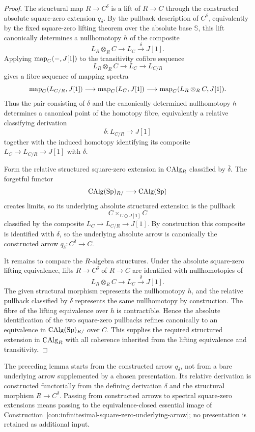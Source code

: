 \begin{proof}
The structural map $R\to C^\delta$ is a lift of $R\to C$ through the
constructed absolute square-zero extension \(q_\delta\).  By the pullback
description of \(C^\delta\), equivalently by the fixed square-zero lifting
theorem over the absolute base \(\mathbb S\), this lift canonically determines
a nullhomotopy \(h\) of the composite
\[
    L_R\otimes_RC
    \longrightarrow
    L_C
    \xrightarrow{\delta}
    J[1].
\]
Applying $\operatorname{map}_C(-,J[1])$ to the transitivity cofibre sequence
\[
    L_R\otimes_RC\longrightarrow L_C\longrightarrow L_{C/R}
\]
gives a fibre sequence of mapping spectra
\[
    \operatorname{map}_C(L_{C/R},J[1])
    \longrightarrow
    \operatorname{map}_C(L_C,J[1])
    \longrightarrow
    \operatorname{map}_C(L_R\otimes_RC,J[1]).
\]
Thus the pair consisting of $\delta$ and the canonically determined
nullhomotopy $h$ determines a canonical point of the homotopy fibre,
equivalently a relative classifying derivation
\[
    \overline\delta:L_{C/R}\longrightarrow J[1]
\]
together with the induced homotopy identifying its composite
$L_C\to L_{C/R}\to J[1]$ with $\delta$.

Form the relative structured square-zero extension in $\operatorname{CAlg}_R$ classified by
$\overline\delta$.  The forgetful functor
\[
    \operatorname{CAlg}(\mathrm{Sp})_{R/}\longrightarrow\operatorname{CAlg}(\mathrm{Sp})
\]
creates limits, so its underlying absolute structured extension is the
pullback
\[
    C\times_{C\oplus J[1]}C
\]
classified by the composite $L_C\to L_{C/R}\to J[1]$.  By construction this
composite is identified with $\delta$, so the underlying absolute arrow is
canonically the constructed arrow \(q_\delta:C^\delta\to C\).

It remains to compare the $R$-algebra structures.  Under the absolute
square-zero lifting equivalence, lifts $R\to C^\delta$ of $R\to C$ are
identified with nullhomotopies of
\[
    L_R\otimes_RC\longrightarrow L_C\xrightarrow{\delta}J[1].
\]
The given structural morphism represents the nullhomotopy $h$, and the
relative pullback classified by $\overline\delta$ represents the same
nullhomotopy by construction.  The fibre of the lifting equivalence over
$h$ is contractible.  Hence the absolute identification of the two
square-zero pullbacks refines canonically to an equivalence in
$\operatorname{CAlg}(\mathrm{Sp})_{R/}$ over $C$.  This supplies the required structured extension
in $\operatorname{CAlg}_R$ with all coherence inherited from the lifting equivalence and
transitivity.
\end{proof}

\begin{remark}
\label{rem:infinitesimal-structured-data-retention}
The preceding lemma starts from the constructed arrow \(q_\delta\), not from a
bare underlying arrow supplemented by a chosen presentation.  Its relative
derivation is constructed functorially from the defining derivation
\(\delta\) and the structural morphism \(R\to C^\delta\).  Passing from
constructed arrows to spectral square-zero extensions means passing to the
equivalence-closed essential image of
Construction~\ref{con:infinitesimal-square-zero-underlying-arrow}; no
presentation is retained as additional input.
\end{remark}

